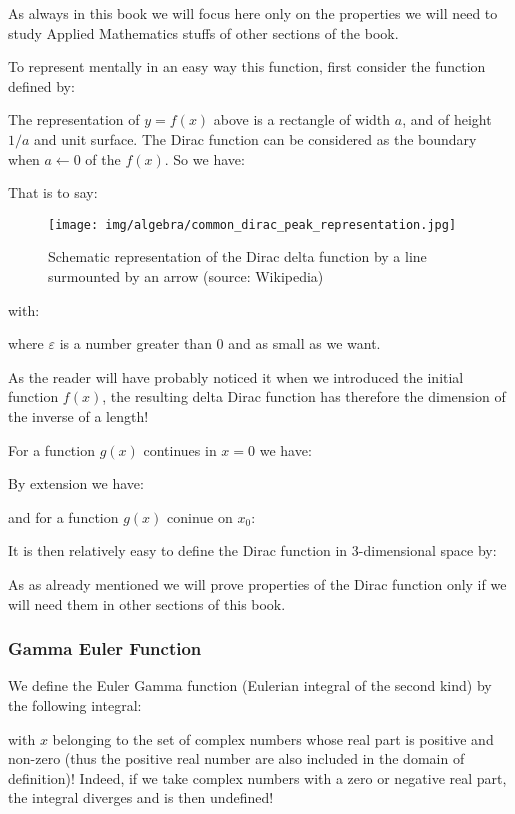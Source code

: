 	As always in this book we will focus here only on the properties we will need to study Applied Mathematics stuffs of other sections of the book.
	
	To represent mentally in an easy way this function, first consider the function defined by:
	
	The representation of $y=f(x)$ above is a rectangle of width $a$, and of height $1/ a$ and unit surface. The Dirac function can be considered as the boundary when $a\leftarrow 0$ of the  $f (x)$. So we have:		
	
	That is to say:
	\begin{figure}[H]
		\centering
		\texttt{[image: img/algebra/common\_dirac\_peak\_representation.jpg]}
		\caption[Schematic representation of the Dirac delta function by a line surmounted by an arrow]{Schematic representation of the Dirac delta function by a line surmounted by an arrow (source: Wikipedia)}
	\end{figure}
	with:
	
	where $\varepsilon$ is a number greater than $0$ and as small as we want.
	\begin{tcolorbox}[title=Remark,colframe=black,arc=10pt]
		As the reader will have probably noticed it when we introduced the initial function $f (x)$, the resulting delta Dirac function has therefore the dimension of the inverse of a length!
	\end{tcolorbox}
	For a function $g (x)$ continues in $x = 0$ we have:
	
	By extension we have:
	
	and for a function $g (x)$ coninue on $x_0$:
	
	It is then relatively easy to define the Dirac function in 3-dimensional space by:
	
	As as already mentioned we will prove properties of the Dirac function only if we will need them in other sections of this book.
	
	\subsubsection{Gamma Euler Function}\label{gamma euler function}
	We define the Euler Gamma function (Eulerian integral of the second kind) by the following integral:
	
	with $x$ belonging to the set of complex numbers whose real part is positive and non-zero (thus the positive real number are also included in the domain of definition)! Indeed, if we take complex numbers with a zero or negative real part, the integral diverges and is then undefined!
	
